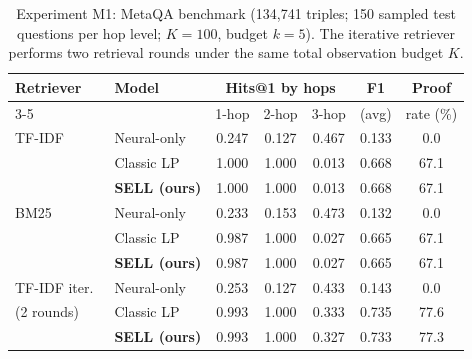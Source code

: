 \begin{table}[t]
\centering
\caption{Experiment M1: MetaQA benchmark (134{,}741 triples; 150 sampled test questions per hop level;
$K{=}100$, budget $k{=}5$). The iterative retriever performs two retrieval rounds under the same total
observation budget $K$.}
\label{tab:metaqa}
\small
\begin{tabular}{llccccc}
\toprule
Retriever & Model & \multicolumn{3}{c}{Hits@1 by hops} & F1 & Proof \\
\cmidrule(lr){3-5}
 & & 1-hop & 2-hop & 3-hop & (avg) & rate (\%) \\
\midrule
TF-IDF & Neural-only & 0.247 & 0.127 & 0.467 & 0.133 & 0.0 \\
 & Classic LP & 1.000 & 1.000 & 0.013 & 0.668 & 67.1 \\
 & \textbf{SELL (ours)} & 1.000 & 1.000 & 0.013 & 0.668 & 67.1 \\
\midrule
BM25 & Neural-only & 0.233 & 0.153 & 0.473 & 0.132 & 0.0 \\
 & Classic LP & 0.987 & 1.000 & 0.027 & 0.665 & 67.1 \\
 & \textbf{SELL (ours)} & 0.987 & 1.000 & 0.027 & 0.665 & 67.1 \\
\midrule
TF-IDF iter.\ & Neural-only & 0.253 & 0.127 & 0.433 & 0.143 & 0.0 \\
(2 rounds) & Classic LP & 0.993 & 1.000 & 0.333 & 0.735 & 77.6 \\
 & \textbf{SELL (ours)} & 0.993 & 1.000 & 0.327 & 0.733 & 77.3 \\
\bottomrule
\end{tabular}
\end{table}
